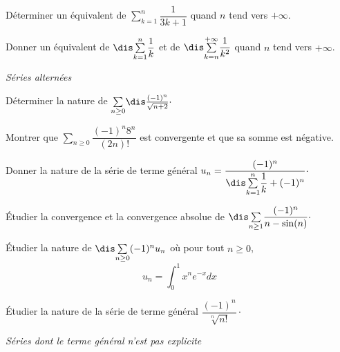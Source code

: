 \documentclass[a4paper,10pt]{report}
\newcommand{\Sum}[2]{\ensuremath{\textstyle{\sum\limits_{#1}^{#2}}}}
\begin{document}
\begin{Exa} Déterminer un équivalent de $\Sum{k=1}n \dfrac{1}{3k+1}$ quand $n$ tend vers $+ \infty$.
\end{Exa}

\begin{Exa} Donner un équivalent de $\dis \Sum{k=1}n \dfrac{1}{k}$ et de $\dis \Sum{k=n}{+ \infty} \dfrac{1}{k^2}$ quand $n$ tend vers $+ \infty$.
\end{Exa} 

\medskip

\begin{center}
\textit{{ {\large Séries alternées}}}
\end{center}

\medskip

\begin{Exa} Déterminer la nature de $\Sum{n \geq 0}{} \dis\frac{(-1)^n}{\sqrt{n+2}}\cdot$
\end{Exa}

\begin{Exa}[\ding{80}] Montrer que $\Sum{n \geq 0}{} {\dfrac{( - 1)^n 8^n}{(2n)!}}$ est convergente et que sa somme est négative. \end{Exa}

\begin{Exa}[\ding{80}] Donner la nature de la série de terme général $u_n = \dfrac{(-1)^n}{\dis \Sum{k=1}{n} \dfrac{1}{k} + (-1)^n} \cdot$
\end{Exa}

\begin{Exa} Étudier la convergence et la convergence absolue de $\dis \Sum{n \geq 1}{} \dfrac{(-1)^n}{n-\sin(n)}\cdot$
\end{Exa}

\begin{Exa} Étudier la nature de $\dis \Sum{n \geq 0}{} (-1)^n u_n$ où pour tout $n \geq 0$,
\vspace{-0.4cm}
$$ u_n = \int_{0}^1 x^n e^{-x} dx$$
\end{Exa}

\begin{Exa}[\ding{80}] Étudier la nature de la série de terme général $\dfrac{(-1)^n}{\sqrt[n]{n!}} \cdot$
\end{Exa}



\medskip

\begin{center}
\textit{{ {\large Séries dont le terme général n'est pas explicite}}}
\end{center}
\end{document}
